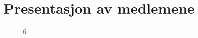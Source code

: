 \chapter{Presentasjon av medlemene}

\begin{figure}[h]
    \centering
    
    \label{vedlegg:presentasjon}
6\end{figure}\newpage




